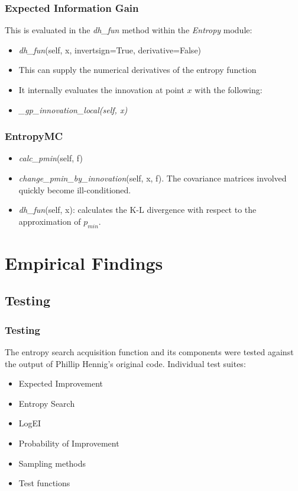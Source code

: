 \documentclass[10pt,handout]{beamer}
\begin{document}
\begin{frame}
\frametitle{Expected Information Gain}

This is evaluated in the \emph{dh\_fun} method within the \emph{Entropy} module:

\begin{itemize}
  \item \emph{dh\_fun}(self, x, invertsign=True, derivative=False)
  \item This can supply the numerical derivatives of the entropy function
  \item It internally evaluates the innovation at point $x$ with the following:
  \item \textit{\_gp\_innovation\_local(self, x)}
\end{itemize}


\end{frame}



\begin{frame}
\frametitle{EntropyMC}

\begin{itemize}
  \item \emph{calc\_pmin}(self, f)
  \item \emph{change\_pmin\_by\_innovation}(self, x, f). The covariance matrices
  involved quickly become ill-conditioned.
  \item \emph{dh\_fun}(self, x): calculates the K-L divergence with respect to
  the approximation of $p_{min}$.
\end{itemize}

\end{frame}


\section{Empirical Findings}

\subsection{Testing}
\begin{frame}
\frametitle{Testing}

The entropy search acquisition function and its components were tested
against the output of Phillip Hennig's original code. Individual test suites:

\begin{itemize}
  \item Expected Improvement
  \item Entropy Search
  \item LogEI
  \item Probability of Improvement
  \item Sampling methods
  \item Test functions
\end{itemize}
\end{frame}
\end{document}
